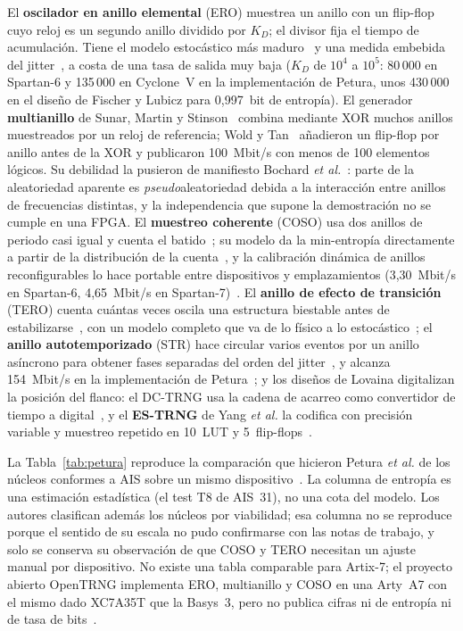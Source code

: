 El \textbf{oscilador en anillo elemental} (ERO) muestrea un anillo con un
flip-flop cuyo reloj es un segundo anillo dividido por $K_D$; el divisor
fija el tiempo de acumulación. Tiene el modelo estocástico más
maduro~\cite{baudet_2011_security, killmann_2008_design, ma_2014_entropy} y
una medida embebida del jitter~\cite{fischer_2014_embedded}, a costa de
una tasa de salida muy baja ($K_D$ de $10^4$ a $10^5$: 80\,000 en
Spartan-6 y 135\,000 en Cyclone~V en la implementación de Petura, unos
430\,000 en el diseño de Fischer y Lubicz para 0,997~bit de entropía). El
generador \textbf{multianillo} de Sunar, Martin y
Stinson~\cite{sunar_2007_provably} combina mediante XOR muchos anillos
muestreados por un reloj de referencia; Wold y Tan~\cite{wold_2009_analysis}
añadieron un flip-flop por anillo antes de la XOR y publicaron 100~Mbit/s
con menos de 100 elementos lógicos. Su debilidad la pusieron de manifiesto
Bochard \emph{et al.}~\cite{bochard_2010_true}: parte de la aleatoriedad
aparente es \emph{pseudo}aleatoriedad debida a la interacción entre
anillos de frecuencias distintas, y la independencia que supone la
demostración no se cumple en una FPGA. El \textbf{muestreo coherente}
(COSO) usa dos anillos de periodo casi igual y cuenta el batido~\cite{kohlbrenner_2004_embedded,
valtchanov_2009_enhanced}; su modelo da la min-entropía directamente a
partir de la distribución de la cuenta~\cite{peetermans_2021_configurable},
y la calibración dinámica de anillos reconfigurables lo hace portable
entre dispositivos y emplazamientos (3,30~Mbit/s en Spartan-6,
4,65~Mbit/s en Spartan-7)~\cite{peetermans_2019_portable, peetermans_2021_configurable}.
El \textbf{anillo de efecto de transición} (TERO) cuenta cuántas veces
oscila una estructura biestable antes de estabilizarse~\cite{varchola_2010_new},
con un modelo completo que va de lo físico a lo
estocástico~\cite{bernard_2019_physical}; el \textbf{anillo
autotemporizado} (STR) hace circular varios eventos por un anillo
asíncrono para obtener fases separadas del orden del
jitter~\cite{cherkaoui_2013_very}, y alcanza 154~Mbit/s en la
implementación de Petura~\cite{petura_2016_survey}; y los diseños de
Lovaina digitalizan la posición del flanco: el DC-TRNG usa la cadena de
acarreo como convertidor de tiempo a digital~\cite{rozic_2015_highly}, y
el \textbf{ES-TRNG} de Yang \emph{et al.} la codifica con precisión
variable y muestreo repetido en 10~LUT y
5~flip-flops~\cite{yang_2018_estrng}.

La Tabla~\ref{tab:petura} reproduce la comparación que hicieron Petura
\emph{et al.} de los núcleos conformes a AIS sobre un mismo
dispositivo~\cite{petura_2016_survey}. La columna de entropía es una
estimación estadística (el test T8 de AIS~31), no una cota del modelo.
Los autores clasifican además los núcleos por viabilidad; esa columna no
se reproduce porque el sentido de su escala no pudo confirmarse con las
notas de trabajo, y solo se conserva su observación de que COSO y TERO
necesitan un ajuste manual por dispositivo. No existe una tabla comparable para Artix-7; el proyecto
abierto OpenTRNG implementa ERO, multianillo y COSO en una Arty~A7 con el
mismo dado XC7A35T que la Basys~3, pero no publica cifras ni de entropía
ni de tasa de bits~\cite{opentrng_2025_docs}.

